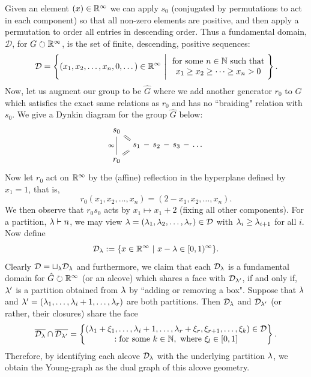 Given an element $(x)\in \mathbb{R}^\infty$ we can apply $s_0$ (conjugated by permutations to act in each component) so that all non-zero elements are positive, and then apply a permutation to order all entries in descending order. Thus a fundamental domain, $\mathcal{D}$, for $G\circlearrowright \mathbb{R}^\infty$, is the set of finite, descending, positive sequences:
\[\mathcal{D}= \left\{(x_1,x_2,\dots, x_n,0,\dots) \in \mathbb{R}^\infty \ \Bigg| \ \begin{matrix}\text{ for some } n\in \mathbb{N} \text{ such that }\\ x_1\geq x_2\geq \dots \geq x_n>0\end{matrix} \right\}.\]
Now, let us augment our group to be $\hat{G}$ where we add another generator $r_0$ to $G$ which satisfies the exact same relations as $r_0$ and has no ``braiding" relation with $s_0$. We give a Dynkin diagram for the group $\hat{G}$ below:
\[ \begin{tikzcd}[column sep=tiny,row sep = tiny]
    s_0\ar[dr,equal]\\
    &s_1\ar[r,dash]&s_2\ar[r,dash]&s_3\ar[r,dash]&\dots\\
    r_0\ar[ur,equal]\ar[uu,dash,"\infty"]
\end{tikzcd}\]
Now let $r_0$ act on $\mathbb{R}^\infty$ by the (affine) reflection in the hyperplane defined by $x_1=1$, that is,
\[r_0(x_1,x_2,\dots,x_n)=(2-x_1,x_2,\dots,x_n).\]
We then observe that $r_0 s_0$ acts by $x_1\mapsto x_1+2$ (fixing all other components). For a partition, $\lambda\vdash n$, we may view $\lambda=(\lambda_1,\lambda_2,\dots, \lambda_r)\in \mathcal{D}$ with $\lambda_i\geq \lambda_{i+1}$ for all $i$. Now define
\[\mathcal{D}_{\lambda}:=\{x\in \mathbb{R}^\infty \ | \ x-\lambda \in [0,1)^\infty  \}.\]
Clearly $\mathcal{D}=\sqcup_{\lambda} \mathcal{D}_{\lambda}$ and furthermore, we claim that each $\mathcal{D}_{\lambda}$ is a fundamental domain for $\hat{G}\circlearrowright \mathbb{R}^\infty$ (or an alcove) which shares a face with $\mathcal{D}_{\lambda'}$, if and only if, $\lambda'$ is a partition obtained from $\lambda$ by ``adding or removing a box". Suppose that $\lambda$ and $\lambda'=(\lambda_1,\dots,\lambda_i+1,\dots ,\lambda_r)$ are both partitions. Then $\mathcal{D}_{\lambda}$ and $\mathcal{D}_{\lambda'}$ (or rather, their closures) share the face
\[\overline{\mathcal{D}_{\lambda}}\cap\overline{\mathcal{D}_{\lambda'}}=\left\{\begin{matrix}(\lambda_1+\xi_1,\dots,\lambda_i+1,\dots,\lambda_r+\xi_r,\xi_{r+1},\dots,\xi_k)\in \mathcal{D}  \\ :\text{for some } k \in \mathbb{N}, \text{ where } \xi_l\in [0,1]\end{matrix} \right\}.\]
Therefore, by identifying each alcove $\mathcal{D}_{\lambda}$ with the underlying partition $\lambda$, we obtain the Young-graph as the dual graph of this alcove geometry.


